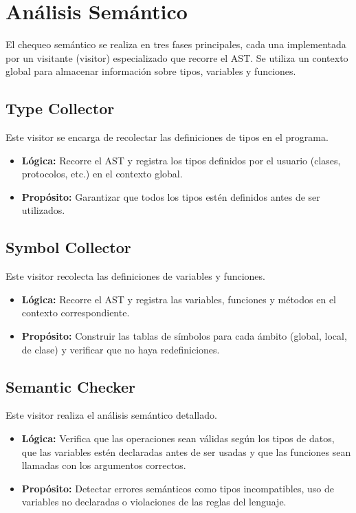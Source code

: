\documentclass{article}
\begin{document}
\section{Análisis Semántico}
El chequeo semántico se realiza en tres fases principales, cada una implementada por un visitante (visitor) especializado que recorre el AST. Se utiliza un contexto global para almacenar información sobre tipos, variables y funciones.
    \subsection{Type Collector}
    Este visitor se encarga de recolectar las definiciones de tipos en el programa.
    \begin{itemize}
        \item \textbf{Lógica:} Recorre el AST y registra los tipos definidos por el usuario (clases, protocolos, etc.) en el contexto global.
        \item \textbf{Propósito:} Garantizar que todos los tipos estén definidos antes de ser utilizados.
    \end{itemize}
    \subsection{Symbol Collector}
    Este visitor recolecta las definiciones de variables y funciones.
    \begin{itemize}
        \item \textbf{Lógica:} Recorre el AST y registra las variables, funciones y métodos en el contexto correspondiente.
        \item \textbf{Propósito:} Construir las tablas de símbolos para cada ámbito (global, local, de clase) y verificar que no haya redefiniciones.
    \end{itemize}
    \subsection{Semantic Checker}
    Este visitor realiza el análisis semántico detallado.
    \begin{itemize}
        \item \textbf{Lógica:} Verifica que las operaciones sean válidas según los tipos de datos, que las variables estén declaradas antes de ser usadas y que las funciones sean llamadas con los argumentos correctos.
        \item \textbf{Propósito:} Detectar errores semánticos como tipos incompatibles, uso de variables no declaradas o violaciones de las reglas del lenguaje.
    \end{itemize}
\end{document}
